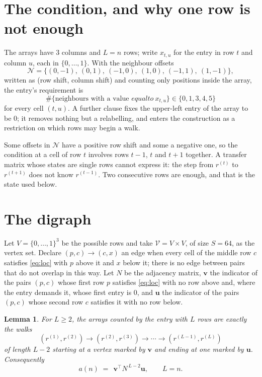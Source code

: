 \documentclass[11pt,a4paper]{article}
\theoremstyle{plain}
\newtheorem{lemma}[theorem]{Lemma}
\theoremstyle{definition}
\begin{document}
\section{The condition, and why one row is not enough}

The arrays have $3$ columns and $L=n$ rows; write $x_{t,u}$ for the entry in
row $t$ and column $u$, each in $\{0,\dots,1\}$. With the neighbour offsets
\[
\mathcal N=\{(0,-1),\ (0,1),\ (-1,0),\ (1,0),\ (-1,1),\ (1,-1)\},
\]
written as (row shift, column shift) and counting only positions inside the array, the
entry's requirement is
\begin{equation}\label{eq:loc}
\#\{\text{neighbours with a value }equal to\ x_{t,u}\}\in\{0,1,3,4,5\}
\end{equation}
for every cell $(t,u)$. A further clause fixes the upper-left entry of the array to be $0$; it removes nothing but a relabelling, and enters the construction as a restriction on which rows may begin a walk.

Some offsets in $\mathcal N$ have a positive row shift and some a negative one, so the
condition at a cell of row $t$ involves rows $t-1$, $t$ and $t+1$ together. A transfer
matrix whose states are single rows cannot express it: the step from $r^{(t)}$ to
$r^{(t+1)}$ does not know $r^{(t-1)}$. Two consecutive rows are enough, and that is
the state used below.

\section{The digraph}

Let $V=\{0,\dots,1\}^{3}$ be the possible rows and take
$\mathcal V=V\times V$, of size $S=64$, as the vertex set. Declare $(p,c)\to(c,x)$ an edge
when every cell of the middle row $c$ satisfies \eqref{eq:loc} with $p$ above it and $x$
below it; there is no edge between pairs that do not overlap in this way. Let $N$ be the
adjacency matrix, $\mathbf{v}$ the indicator of the pairs $(p,c)$ whose first row $p$
satisfies \eqref{eq:loc} with no row above and, where the entry demands it, whose first entry is $0$, and $\mathbf{u}$ the indicator of
the pairs $(p,c)$ whose second row $c$ satisfies it with no row below.

\begin{lemma}\label{lem:walk}
For $L\ge2$, the arrays counted by the entry with $L$ rows are exactly the walks
\[
(r^{(1)},r^{(2)})\to(r^{(2)},r^{(3)})\to\cdots\to(r^{(L-1)},r^{(L)})
\]
of length $L-2$ starting at a vertex marked by $\mathbf{v}$ and ending at one marked by
$\mathbf{u}$. Consequently
\[
a(n)\;=\;\,\mathbf{v}^{\!\top}N^{\,L-2}\mathbf{u},\qquad L=n .
\]
\end{lemma}
\end{document}
